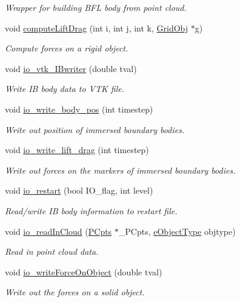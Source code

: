 \begin{DoxyCompactItemize}
\begin{DoxyCompactList}\small\item\em Wrapper for building B\+FL body from point cloud. \end{DoxyCompactList}\item 
void \hyperlink{class_object_manager_a6a35b34d77e7cd56060a6953d0d0860a}{compute\+Lift\+Drag} (int i, int j, int k, \hyperlink{class_grid_obj}{Grid\+Obj} $\ast$g)
\begin{DoxyCompactList}\small\item\em Compute forces on a rigid object. \end{DoxyCompactList}\item 
void \hyperlink{class_object_manager_a39aa351c7b338473be4871111da5c5bd}{io\+\_\+vtk\+\_\+\+I\+Bwriter} (double tval)
\begin{DoxyCompactList}\small\item\em Write IB body data to V\+TK file. \end{DoxyCompactList}\item 
void \hyperlink{class_object_manager_a1f9a40c58bdb3bd9797f7c44864835ec}{io\+\_\+write\+\_\+body\+\_\+pos} (int timestep)
\begin{DoxyCompactList}\small\item\em Write out position of immersed boundary bodies. \end{DoxyCompactList}\item 
void \hyperlink{class_object_manager_ab46e89c9eaf8ca1c9ec264545f39cd7f}{io\+\_\+write\+\_\+lift\+\_\+drag} (int timestep)
\begin{DoxyCompactList}\small\item\em Write out forces on the markers of immersed boundary bodies. \end{DoxyCompactList}\item 
void \hyperlink{class_object_manager_aaa1b7e2a3392c2a8d85606041b986b4d}{io\+\_\+restart} (bool I\+O\+\_\+flag, int level)
\begin{DoxyCompactList}\small\item\em Read/write IB body information to restart file. \end{DoxyCompactList}\item 
void \hyperlink{class_object_manager_a5c11d747c3df9e91d5fc2dac836d7b7e}{io\+\_\+read\+In\+Cloud} (\hyperlink{class_p_cpts}{P\+Cpts} $\ast$\+\_\+\+P\+Cpts, \hyperlink{_object_manager_8h_a7b78fa3db30dfb9c1efc82bf886fe184}{e\+Object\+Type} objtype)
\begin{DoxyCompactList}\small\item\em Read in point cloud data. \end{DoxyCompactList}\item 
void \hyperlink{class_object_manager_adf65260d81584613fa33f2e7658f1b36}{io\+\_\+write\+Force\+On\+Object} (double tval)
\begin{DoxyCompactList}\small\item\em Write out the forces on a solid object. \end{DoxyCompactList}\end{DoxyCompactItemize}
